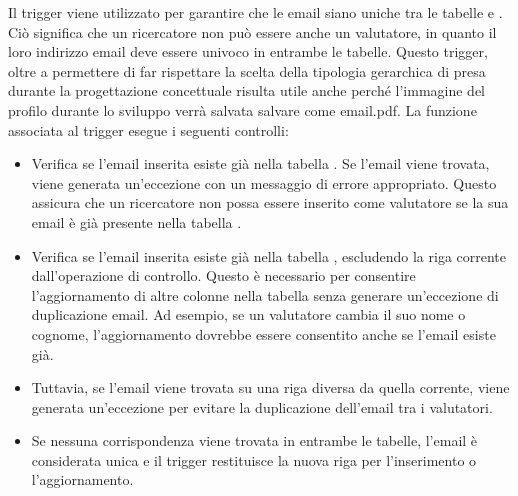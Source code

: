 \documentclass{report}
\begin{document}
Il trigger  viene utilizzato per garantire che le email siano uniche tra le tabelle  e . Ciò significa che un ricercatore non può essere anche un valutatore, in quanto il loro indirizzo email deve essere univoco in entrambe le tabelle.  Questo trigger, oltre a permettere di far rispettare la scelta della tipologia gerarchica di  presa durante la progettazione concettuale risulta utile anche perché l'immagine del profilo durante lo sviluppo verrà salvata salvare come email.pdf. La funzione associata al trigger esegue i seguenti controlli:
\begin{itemize}
\item Verifica se l'email inserita esiste già nella tabella . Se l'email viene trovata, viene generata un'eccezione con un messaggio di errore appropriato. Questo assicura che un ricercatore non possa essere inserito come valutatore se la sua email è già presente nella tabella .
\item Verifica se l'email inserita esiste già nella tabella , escludendo la riga corrente dall'operazione di controllo. Questo è necessario per consentire l'aggiornamento di altre colonne nella tabella  senza generare un'eccezione di duplicazione email. Ad esempio, se un valutatore cambia il suo nome o cognome, l'aggiornamento dovrebbe essere consentito anche se l'email esiste già. \item Tuttavia, se l'email viene trovata su una riga diversa da quella corrente, viene generata un'eccezione per evitare la duplicazione dell'email tra i valutatori.
\item Se nessuna corrispondenza viene trovata in entrambe le tabelle, l'email è considerata unica e il trigger restituisce la nuova riga per l'inserimento o l'aggiornamento.
\end{itemize}
\end{document}
